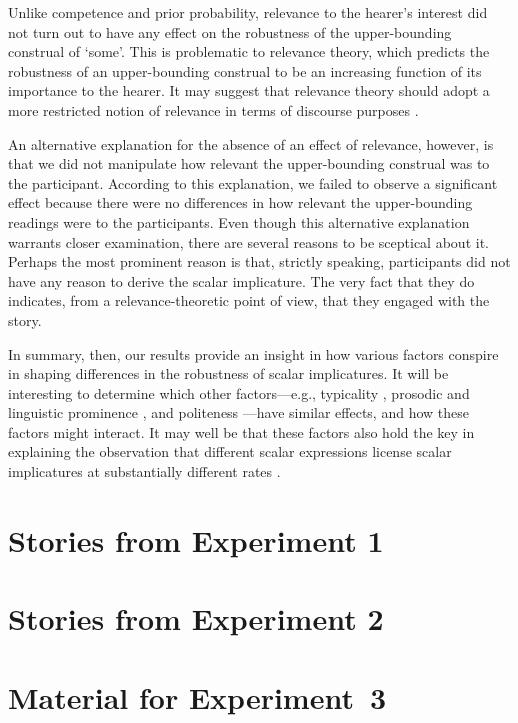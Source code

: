 \documentclass[12pt]{article}
\begin{document}
Unlike competence and prior probability, relevance to the hearer's interest did not turn out to have any effect on the robustness of the upper-bounding construal of `some'. This is problematic to relevance theory, which predicts the robustness of an upper-bounding construal to be an increasing function of its importance to the hearer. It may suggest that relevance theory should adopt a more restricted notion of relevance in terms of discourse purposes \citep{cummins2015}.

An alternative explanation for the absence of an effect of relevance, however, is that we did not manipulate how relevant the upper-bounding construal was to the participant. According to this explanation, we failed to observe a significant effect because there were no differences in how relevant the upper-bounding readings were to the participants. Even though this alternative explanation warrants closer examination, there are several reasons to be sceptical about it. Perhaps the most prominent reason is that, strictly speaking, participants did not have any reason to derive the scalar implicature. The very fact that they do indicates, from a relevance-theoretic point of view, that they engaged with the story.

In summary, then, our results provide an insight in how various factors conspire in shaping differences in the robustness of scalar implicatures. It will be interesting to determine which other factors---e.g., typicality \citep{tiel2013}, prosodic and linguistic prominence \citep{breheny2006}, and politeness \citep{bonnefon2009}---have similar effects, and how these factors might interact. It may well be that these factors also hold the key in explaining the observation that different scalar expressions license scalar implicatures at substantially different rates \citep{tiel2016}.

\appendix

\section{Stories from Experiment 1}
\label{sec:mater-exper-1}


\section{Stories from Experiment 2}
\label{sec:mater-exper-2}





\normalsize
\section{Material for Experiment~3}
\label{sec:mater-exper-3}




\end{document}
